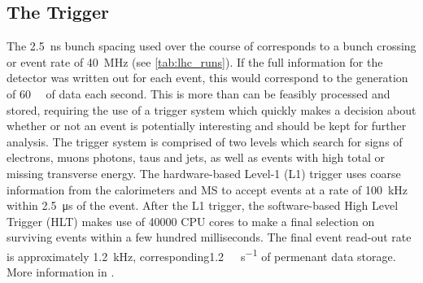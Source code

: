\subsection{The Trigger}\label{sec:trigger}
The \SI{2.5}{\nano\second} bunch spacing used over the course of \runtwo corresponds to a bunch crossing or event rate of \SI{40}{\mega\hertz} (see \cref{tab:lhc_runs}).
If the full information for the detector was written out for each event, this would correspond to the generation of \SI{60}{\tera\byte} of data each second.
This is more than can be feasibly processed and stored, requiring the use of a trigger system which quickly makes a decision about whether or not an event is potentially interesting and should be kept for further analysis.
The trigger system is comprised of two levels which search for signs of electrons, muons photons, taus and jets, as well as events with high total or missing transverse energy.
The hardware-based Level-1 (L1) trigger uses coarse information from the calorimeters and MS to accept events at a rate of \SI{100}{\kilo\hertz} within \SI{2.5}{\micro\second} of the event.
After the L1 trigger, the software-based High Level Trigger (HLT) makes use of \num{40000} CPU cores to make a final selection on surviving events within a few hundred milliseconds. 
The final event read-out rate is approximately \SI{1.2}{\kilo\hertz}, corresponding\SI{1.2}{\giga\byte\per\second} of permenant data storage.
More information in \cite{TRIG-2016-01}.


